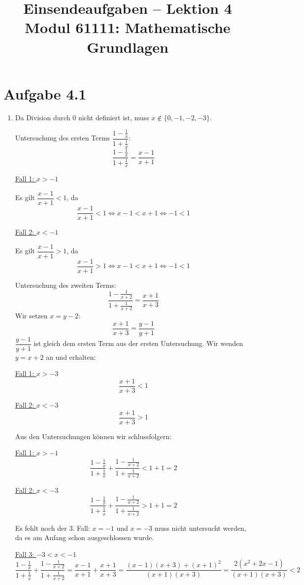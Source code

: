 \documentclass[a4paper,12pt]{article}
\title{Einsendeaufgaben -- Lektion 4\\[0.5em]
\large Modul 61111: Mathematische Grundlagen}
\author{}
\date{}
\begin{document}
\maketitle

\section*{Aufgabe 4.1}

\begin{enumerate}[label=\alph*)]

    \item
    Da Division durch $0$ nicht definiert ist, muss $x \notin \{0, -1, -2, -3\}$.

    Untersuchung des ersten Terms $\dfrac{1-\frac{1}{x}}{1+\frac{1}{x}}$:
    \[
        \frac{1-\frac{1}{x}}{1+\frac{1}{x}} = \frac{x-1}{x+1}
    \]

    \underline{Fall 1: $x > -1$}

    Es gilt $\dfrac{x-1}{x+1} < 1$, da
    \[
        \frac{x-1}{x+1} < 1 \iff x-1 < x+1 \iff -1 < 1
    \]

    \underline{Fall 2: $x < -1$}

    Es gilt $\dfrac{x-1}{x+1} > 1$, da
    \[
        \frac{x-1}{x+1} > 1 \iff x-1 < x+1 \iff -1 < 1
    \]

    Untersuchung des zweiten Terms:
    \[
        \frac{1-\frac{1}{x+2}}{1+\frac{1}{x+2}} = \frac{x+1}{x+3}
    \]
    Wir setzen $x = y - 2$:
    \[
        \frac{x+1}{x+3} = \frac{y-1}{y+1}
    \]
    $\dfrac{y-1}{y+1}$ ist gleich dem ersten Term aus der ersten Untersuchung.
    Wir wenden $y = x+2$ an und erhalten:

    \underline{Fall 1: $x > -3$}
    \[
        \frac{x+1}{x+3} < 1
    \]

    \underline{Fall 2: $x < -3$}
    \[
        \frac{x+1}{x+3} > 1
    \]

    Aus den Untersuchungen können wir schlussfolgern:

    \underline{Fall 1: $x > -1$}
    \[
        \frac{1-\frac{1}{x}}{1+\frac{1}{x}} + \frac{1-\frac{1}{x+2}}{1+\frac{1}{x+2}} < 1 + 1 = 2
    \]

    \underline{Fall 2: $x < -3$}
    \[
        \frac{1-\frac{1}{x}}{1+\frac{1}{x}} + \frac{1-\frac{1}{x+2}}{1+\frac{1}{x+2}} > 1 + 1 = 2
    \]

    Es fehlt noch der 3. Fall: $x = -1$ und $x = -3$ muss nicht untersucht werden,
    da es am Anfang schon ausgeschlossen wurde.

    \underline{Fall 3: $-3 < x < -1$}
    \[
        \frac{1-\frac{1}{x}}{1+\frac{1}{x}} + \frac{1-\frac{1}{x+2}}{1+\frac{1}{x+2}}
        = \frac{x-1}{x+1} + \frac{x+1}{x+3}
        = \frac{(x-1)(x+3) + (x+1)^2}{(x+1)(x+3)}
        = \frac{2(x^2+2x-1)}{(x+1)(x+3)} < 2
    \]


\end{enumerate}
\end{document}
